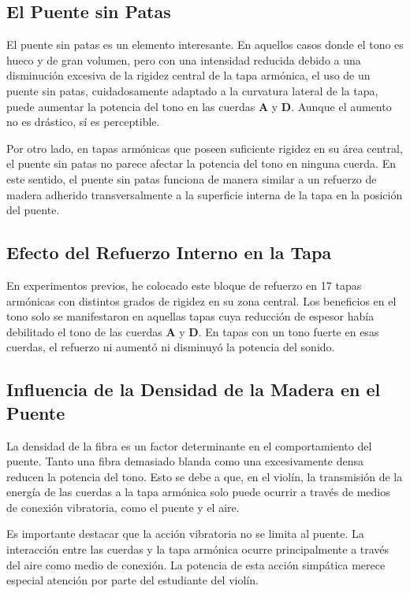 \documentclass[12pt]{book}
\begin{document}
\subsection*{El Puente sin Patas}

El puente sin patas es un elemento interesante. En aquellos casos donde el tono es hueco y de gran volumen, pero con una intensidad reducida debido a una disminución excesiva de la rigidez central de la tapa armónica, el uso de un puente sin patas, cuidadosamente adaptado a la curvatura lateral de la tapa, puede aumentar la potencia del tono en las cuerdas \textbf{A} y \textbf{D}. Aunque el aumento no es drástico, sí es perceptible.

Por otro lado, en tapas armónicas que poseen suficiente rigidez en su área central, el puente sin patas no parece afectar la potencia del tono en ninguna cuerda. En este sentido, el puente sin patas funciona de manera similar a un refuerzo de madera adherido transversalmente a la superficie interna de la tapa en la posición del puente.

\subsection*{Efecto del Refuerzo Interno en la Tapa}

En experimentos previos, he colocado este bloque de refuerzo en 17 tapas armónicas con distintos grados de rigidez en su zona central. Los beneficios en el tono solo se manifestaron en aquellas tapas cuya reducción de espesor había debilitado el tono de las cuerdas \textbf{A} y \textbf{D}. En tapas con un tono fuerte en esas cuerdas, el refuerzo ni aumentó ni disminuyó la potencia del sonido.

\subsection*{Influencia de la Densidad de la Madera en el Puente}

La densidad de la fibra es un factor determinante en el comportamiento del puente. Tanto una fibra demasiado blanda como una excesivamente densa reducen la potencia del tono. Esto se debe a que, en el violín, la transmisión de la energía de las cuerdas a la tapa armónica solo puede ocurrir a través de medios de conexión vibratoria, como el puente y el aire. 

Es importante destacar que la acción vibratoria no se limita al puente. La interacción entre las cuerdas y la tapa armónica ocurre principalmente a través del aire como medio de conexión. La potencia de esta acción simpática merece especial atención por parte del estudiante del violín.
\end{document}
